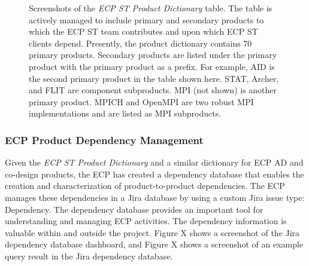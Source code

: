 \begin{figure}
	\centering
	\caption{Screenshots of the \textit{ECP ST Product Dictionary} table.  The table is actively managed to include primary and secondary products to which the ECP ST team contributes and upon which ECP ST clients depend.  Presently, the product dictionary contains 70 primary products.  Secondary products are listed under the primary product with the primary product as a prefix.  For example, AID is the second primary product in the table shown here.  STAT, Archer, and FLIT are component subproducts.  MPI (not shown) is another primary product.  MPICH and OpenMPI are two robust MPI implementations and are listed as MPI subproducts.}
	\label{fig:product-dictionary}
\end{figure}

\subsubsection{ECP Product Dependency Management}\label{subsubsect:dep-management}
Given the \textit{ECP ST Product Dictionary} and a similar dictionary for ECP AD and co-design products, the ECP has created a dependency database that enables the creation and characterization of product-to-product dependencies. The ECP manages these dependencies in a Jira database by using a custom Jira issue type: Dependency.  The dependency database provides an important tool for understanding and managing ECP activities.  The dependency information is valuable within and outside the project.  Figure X  shows a screenshot of the Jira dependency database dashboard, and Figure X  shows a screenshot of an example query result in the Jira dependency database.

